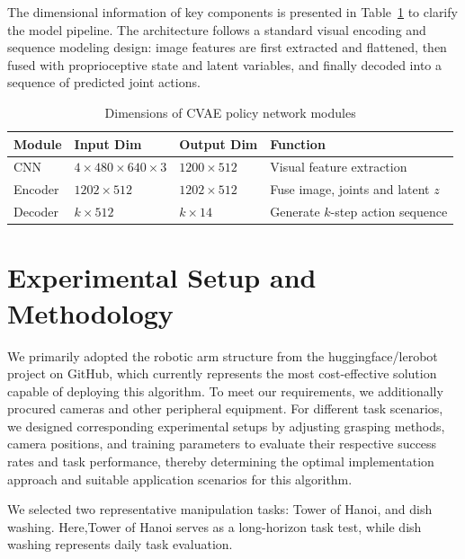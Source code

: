 \documentclass[runningheads]{llncs}
\begin{document}
The dimensional information of key components is presented in Table~\ref{tab:dim_summary} to clarify the model pipeline. The architecture follows a standard visual encoding and sequence modeling design: image features are first extracted and flattened, then fused with proprioceptive state and latent variables, and finally decoded into a sequence of predicted joint actions.


\begin{table}[htbp]
    \centering
	\caption{Dimensions of CVAE policy network modules}
	\label{tab:dim_summary}
	\begin{tabularx}{\textwidth}{@{}>{\hsize=0.5\hsize\centering\arraybackslash}X 
			>{\hsize=1.0\hsize\centering\arraybackslash}X 
			>{\hsize=0.8\hsize\centering\arraybackslash}X 
			>{\hsize=1.7\hsize\centering\arraybackslash}X@{}}
		\toprule
		\textbf{Module} & \textbf{Input Dim} & \textbf{Output Dim} & \textbf{Function} \\
		\midrule
		CNN & $4 \times 480 \times 640 \times 3$ & $1200 \times 512$ & Visual feature extraction \\
		Encoder & $1202 \times 512$ & $1202 \times 512$ & Fuse image, joints and latent $z$ \\
		Decoder & $k \times 512$ & $k \times 14$ & Generate $k$-step action sequence \\
		\bottomrule
	\end{tabularx}
\end{table}

\section{Experimental Setup and Methodology}
We primarily adopted the robotic arm structure from the huggingface/lerobot project on GitHub, which currently represents the most cost-effective solution capable of deploying this algorithm. To meet our requirements, we additionally procured cameras and other peripheral equipment. For different task scenarios, we designed corresponding experimental setups by adjusting grasping methods, camera positions, and training parameters to evaluate their respective success rates and task performance, thereby determining the optimal implementation approach and suitable application scenarios for this algorithm.

We selected two representative manipulation tasks: Tower of Hanoi, and dish washing. Here,Tower of Hanoi serves as a long-horizon task test, while dish washing represents daily task evaluation.
\end{document}
